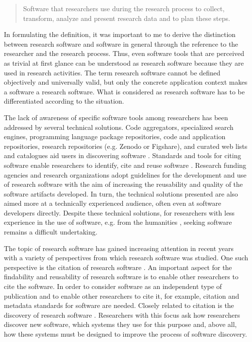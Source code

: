 \documentclass[12pt, a4paper, titlepage, oneside, abstract=true, toc=listof, toc=bibliography, BCOR=1cm]{scrreprt}
\begin{document}
\begin{quotation}
Software that researchers use during the research process to collect, transform, analyze and present research data and to plan these steps.
\end{quotation}

In formulating the definition, it was important to me to derive the distinction between research software and software in general through the reference to the researcher and the research process. Thus, even software tools that are perceived as trivial at first glance can be understood as research software because they are used in research activities. The term research software cannot be defined objectively and universally valid, but only the concrete application context makes a software a research software. What is considered as research software has to be differentiated according to the situation. 

The lack of awareness of specific software tools among researchers has been addressed by several technical solutions. Code aggregators, specialized search engines, programming language package repositories, code and application repositories, research repositories (e.g. Zenodo or Figshare), and curated web lists and catalogues aid users in discovering software \citep{Struck2018}. Standards and tools for citing software enable researchers to identify, cite and reuse software \citep[e.g.][]{Niemeyer2016, Smith2016, Soito2017}. Research funding agencies and research organizations \citep[e.g.][]{Haupt2018, Katerbow2018, Scheliga2019} adopt guidelines for the development and use of research software with the aim of increasing the reusability and quality of the software artifacts developed. In turn, the technical solutions presented are also aimed more at a technically experienced audience, often even at software developers directly. Despite these technical solutions, for researchers with less experience in the use of software, e.g. from the humanities \citep{Rimmer2006}, seeking software remains a difficult undertaking.

The topic of research software has gained increasing attention in recent years with a variety of perspectives from which research software was studied. 
One such perspective is the citation of research software \citep[e.g.][]{Allen2020, Cosmo2020, Druskat2020, Katz2020, Nielsen2019, Niemeyer2016, Soito2017}. An important aspect for the findability and reusability of research software is to enable other researchers to cite the software. In order to consider software as an independent type of publication and to enable other researchers to cite it, for example, citation and metadata standards for software are needed.
Closely related to citation is the discovery of research software \citep[e.g.][]{Howison2015, Hucka2018, MurphyHill2015, Struck2018}. Researchers with this focus ask how researchers discover new software, which systems they use for this purpose and, above all, how these systems must be designed to improve the process of software discovery. 
\end{document}
